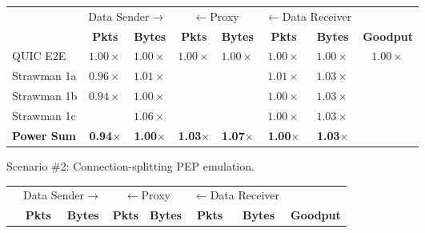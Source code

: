 \begin{figure}[ht]
\begin{subfigure}{\columnwidth}
  \setlength{\tabcolsep}{2pt}
  \centering
  \begin{tabular}{lccccccc}
    \toprule
    & \multicolumn{2}{c}{Data Sender$\rightarrow$} & \multicolumn{2}{c}{$\leftarrow$Proxy} & \multicolumn{2}{c}{$\leftarrow$Data Receiver} & \\
    & \bf Pkts & \bf Bytes & \bf Pkts & \bf Bytes & \bf Pkts & \bf Bytes & \bf Goodput \\
    \midrule
    QUIC E2E & $1.00\times$ & $1.00\times$ & $1.00\times$ & $1.00\times$ & $1.00\times$ & $1.00\times$ & $1.00\times$ \\
    Strawman 1a & $0.96\times$ & $1.01\times$ & \cellcolor{LighterRed}{$2.02\times$} & \cellcolor{LightestRed}{$1.56\times$} & $1.01\times$ & $1.03\times$ & \cellcolor{LighterGreen}{$3.33\times$} \\
    Strawman 1b & $0.94\times$ & $1.00\times$ & \cellcolor{LighterRed}{$2.00\times$} & \cellcolor{LightestRed}{$1.78\times$} & $1.00\times$ & $1.03\times$ & \cellcolor{LightGreen}{$3.53\times$} \\
    Strawman 1c & \cellcolor{LightestRed}{$1.83\times$} & $1.06\times$ & \cellcolor{LighterRed}{$2.01\times$} & \cellcolor{LightestRed}{$1.83\times$} & $1.00\times$ & $1.03\times$ & \cellcolor{LightGreen}{$3.46\times$} \\
    \bf \textcolor{black!50!blue}{Power Sum}   & \textcolor{black!50!blue}{\bf 0.94$\times$} & \textcolor{black!50!blue}{\bf 1.00$\times$} & \textcolor{black!50!blue}{\bf 1.03$\times$} & \textcolor{black!50!blue}{\bf 1.07$\times$} & \textcolor{black!50!blue}{\bf 1.00$\times$} & \textcolor{black!50!blue}{\bf 1.03$\times$} & \cellcolor{LightGreen}{\textcolor{black!50!blue}{\bf 3.55$\times$}} \\
    \bottomrule
  \end{tabular}
  \caption{Scenario \#2: Connection-splitting PEP emulation.}
  \label{tab:packet-overhead:retx}
\end{subfigure}
\begin{subfigure}{\columnwidth}
  \setlength{\tabcolsep}{2pt}
  \centering
  \begin{tabular}{lccccccc}
    \toprule
    & \multicolumn{2}{c}{Data Sender$\rightarrow$} & \multicolumn{2}{c}{$\leftarrow$Proxy} & \multicolumn{2}{c}{$\leftarrow$Data Receiver} & \\
    & \bf Pkts & \bf Bytes & \bf Pkts & \bf Bytes & \bf Pkts & \bf Bytes & \bf Goodput \\

\end{tabular}
\end{subfigure}
\end{figure}
